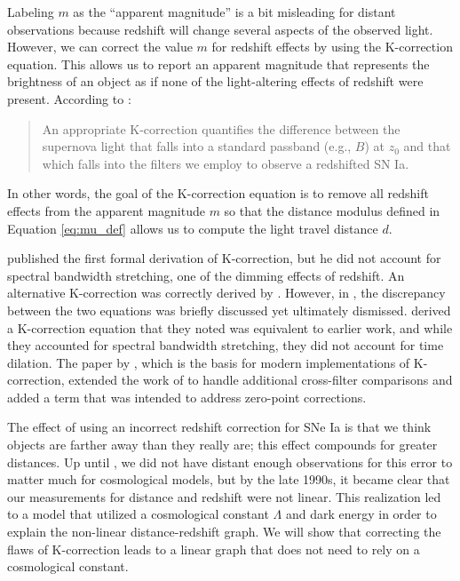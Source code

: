 \documentclass[aps,prl,reprint,amsmath,floatfix]{revtex4-2}
\begin{document}
Labeling $m$ as the ``apparent magnitude'' is a bit misleading for distant
observations because redshift will change several aspects of the observed
light. However, we can correct the value $m$ for redshift effects by using the
K-correction equation. This allows us to report an apparent magnitude that
represents the brightness of an object as if none of the light-altering effects
of redshift were present. According to
\citet{riess1998}:

\begin{quote}
  An appropriate K-correction quantifies the difference between the supernova
  light that falls into a standard passband (e.g., $B$) at $z_0$ and that which
  falls into the filters we employ to observe a redshifted SN Ia.
\end{quote}

\noindent In other words, the goal of the K-correction equation is to remove
all redshift effects from the apparent magnitude $m$ so that the distance
modulus defined in Equation \ref{eq:mu_def} allows us to compute the light
travel distance $d$.

\citet{tolman1930} published the first formal derivation of K-correction, but
he did not account for spectral bandwidth stretching, one of the dimming
effects of redshift. An alternative K-correction was correctly derived by
\citet{desitter1934}. However, in \citet{hubble1935}, the discrepancy between
the two equations was briefly discussed yet ultimately dismissed.
\citet{oke1968} derived a K-correction equation that they noted was equivalent
to earlier work, and while they accounted for spectral bandwidth stretching,
they did not account for time dilation. The paper by \citet{kim1996}, which is
the basis for modern implementations of K-correction, extended the work of
\citet{oke1968} to handle additional cross-filter comparisons and added a term
that was intended to address zero-point corrections.

The effect of using an incorrect redshift correction for SNe Ia is that we think
objects are farther away than they really are; this effect compounds for
greater distances. Up until \citet{riess1998}, we did not have distant enough
observations for this error to matter much for cosmological models, but by the
late 1990s, it became clear that our measurements for distance and redshift
were not linear. This realization led to a model that utilized a cosmological
constant $\Lambda$ and dark energy in order to explain the non-linear
distance-redshift graph. We will show that correcting the flaws of K-correction
leads to a linear graph that does not need to rely on a cosmological constant.
\end{document}
